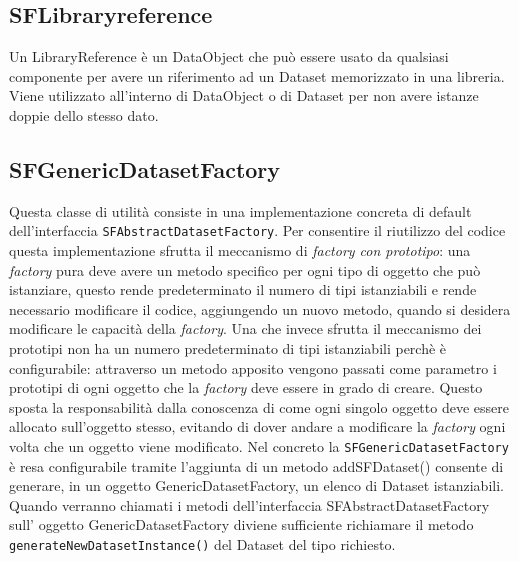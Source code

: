 \subsection{SFLibraryreference}
\label{sub:sflibraryreference}
Un LibraryReference \`e un DataObject che pu\`o essere usato da qualsiasi componente per avere un riferimento ad un Dataset memorizzato in una libreria. Viene utilizzato all'interno di DataObject o di Dataset per non avere istanze doppie dello stesso dato.

\subsection{SFGenericDatasetFactory}
\label{sub:sfgenericdatasetfactory}
Questa classe di utilit\`a consiste in una implementazione concreta di default dell'interfaccia \texttt{SFAbstractDatasetFactory}.
Per consentire il riutilizzo del codice questa implementazione sfrutta il meccanismo di \textit{factory con prototipo}: una \textit{factory} pura deve avere un metodo specifico per ogni tipo di oggetto che pu\`o istanziare, questo rende predeterminato il numero di tipi istanziabili e rende necessario modificare il codice, aggiungendo un nuovo metodo, quando si desidera modificare le capacit\`a della \textit{factory}. Una che invece sfrutta il meccanismo dei prototipi non ha un numero predeterminato di tipi istanziabili perch\`e \`e configurabile: attraverso un metodo apposito vengono passati come parametro i prototipi di ogni oggetto che la \textit{factory} deve essere in grado di creare.
Questo sposta la responsabilit\`a dalla conoscenza di come ogni singolo oggetto deve essere allocato sull'oggetto stesso, evitando di dover andare a modificare la \textit{factory} ogni volta che un oggetto viene modificato.
Nel concreto la \texttt{SFGenericDatasetFactory} \`e resa configurabile tramite l'aggiunta di un metodo addSFDataset() consente di generare, in un oggetto GenericDatasetFactory, un elenco di Dataset istanziabili.
Quando verranno chiamati i metodi dell'interfaccia SFAbstractDatasetFactory sull' oggetto GenericDatasetFactory diviene sufficiente richiamare il metodo \texttt{generateNewDatasetInstance()} del Dataset del tipo richiesto.